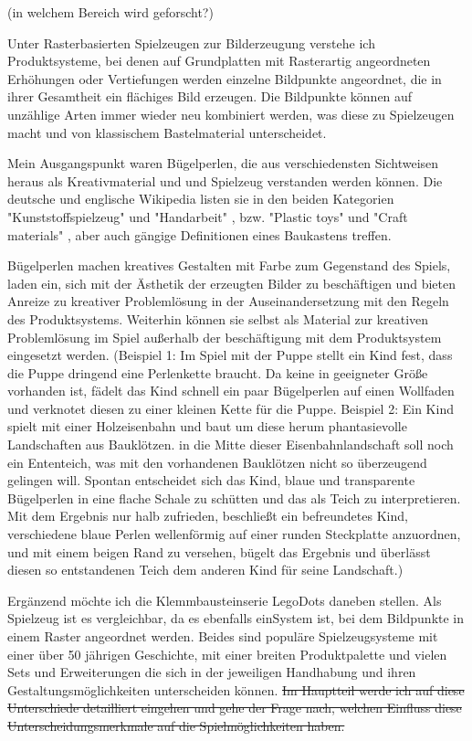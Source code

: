 \documentclass[11pt,a4paper,twoside]{scrreprt}
\begin{document}
(in welchem Bereich wird geforscht?)

Unter Rasterbasierten Spielzeugen zur Bilderzeugung verstehe ich Produktsysteme, bei denen auf Grundplatten mit Rasterartig angeordneten Erhöhungen oder Vertiefungen werden einzelne Bildpunkte angeordnet, die in ihrer Gesamtheit ein flächiges Bild erzeugen. Die Bildpunkte können auf unzählige Arten immer wieder neu kombiniert werden, was diese zu Spielzeugen macht und von klassischem Bastelmaterial unterscheidet.

Mein Ausgangspunkt waren Bügelperlen, die aus verschiedensten Sichtweisen heraus als Kreativmaterial und und Spielzeug verstanden werden können. Die deutsche und englische Wikipedia listen sie in den beiden Kategorien "Kunststoffspielzeug" und "Handarbeit" 
\cite{wiki:de} 
, bzw. "Plastic toys" und "Craft materials" 
\cite{wiki:en}
, aber auch gängige Definitionen eines Baukastens treffen. 
\cite{Leinweber}

Bügelperlen machen kreatives Gestalten mit Farbe zum Gegenstand des Spiels, laden ein, sich mit der Ästhetik der erzeugten Bilder zu beschäftigen und bieten Anreize zu kreativer Problemlösung in der Auseinandersetzung mit den Regeln des Produktsystems. 
Weiterhin können sie selbst als Material zur kreativen Problemlösung im Spiel außerhalb der beschäftigung mit dem Produktsystem eingesetzt werden. (Beispiel 1: Im Spiel mit der Puppe stellt ein Kind fest, dass die Puppe dringend eine Perlenkette braucht. Da keine in geeigneter Größe vorhanden ist, fädelt das Kind schnell ein paar Bügelperlen auf einen Wollfaden und verknotet diesen zu einer kleinen Kette für die Puppe. Beispiel 2: Ein Kind spielt mit einer Holzeisenbahn und baut um diese herum phantasievolle  Landschaften aus Bauklötzen. in die Mitte dieser Eisenbahnlandschaft soll noch ein Ententeich, was mit den vorhandenen Bauklötzen nicht so überzeugend gelingen will. Spontan entscheidet sich das Kind, blaue und transparente Bügelperlen in eine flache Schale zu schütten und das als Teich zu interpretieren. Mit dem Ergebnis nur halb zufrieden, beschließt ein befreundetes Kind, verschiedene blaue Perlen wellenförmig auf einer runden Steckplatte anzuordnen, und mit einem beigen Rand zu versehen, bügelt das Ergebnis und überlässt diesen so entstandenen Teich dem anderen Kind für seine Landschaft.) 

Ergänzend möchte ich die Klemmbausteinserie Lego\texttrademark Dots daneben stellen. Als Spielzeug ist es vergleichbar, da es ebenfalls einSystem ist, bei dem Bildpunkte in einem Raster angeordnet werden. Beides sind populäre Spielzeugsysteme mit einer über 50 jährigen Geschichte, mit einer breiten Produktpalette und vielen Sets und Erweiterungen die sich in der jeweiligen Handhabung und ihren Gestaltungsmöglichkeiten unterscheiden können.
\sout{Im Hauptteil werde ich auf diese Unterschiede detailliert eingehen und gehe der Frage nach, welchen Einfluss diese Unterscheidungsmerkmale auf die Spielmöglichkeiten haben.}
\end{document}
